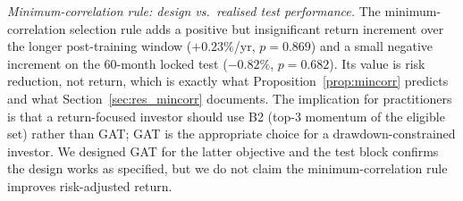 \textit{Minimum-correlation rule: design vs.\ realised test performance.}
The minimum-correlation selection rule adds a positive but insignificant return
increment over the longer post-training window ($+0.23\%$/yr, $p = 0.869$) and a
small negative increment on the 60-month locked test ($-0.82\%$, $p = 0.682$). Its
value is risk reduction, not return, which is exactly what Proposition~\ref{prop:mincorr}
predicts and what Section~\ref{sec:res_mincorr} documents. The implication for
practitioners is that a return-focused investor should use B2 (top-3 momentum of the
eligible set) rather than GAT; GAT is the appropriate choice for a
drawdown-constrained investor. We designed GAT for the latter objective and the test
block confirms the design works as specified, but we do not claim the minimum-correlation
rule improves risk-adjusted return.
